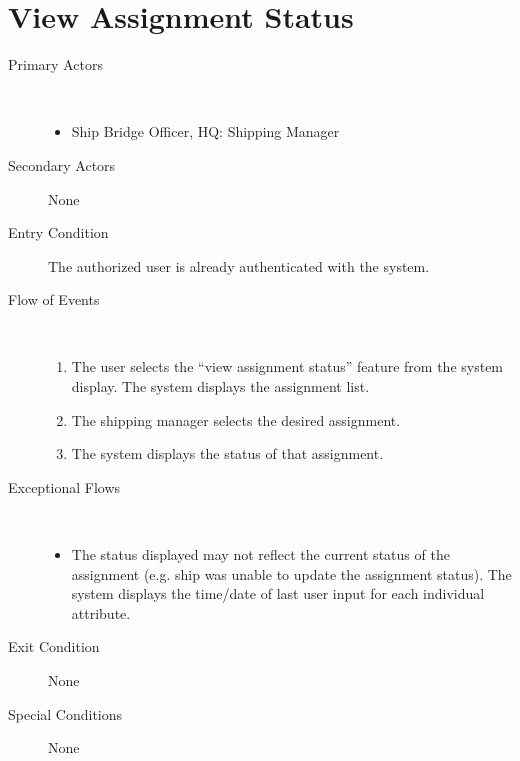 \documentclass[a4paper,10pt]{report}
\begin{document}
\section{View Assignment Status}
\begin{description}
\item[Primary Actors] \
  \begin{itemize}
  \item Ship Bridge Officer, HQ: Shipping Manager
  \end{itemize}
\item[Secondary Actors] None
\item[Entry Condition]
  The authorized user is already authenticated with the system.
\item[Flow of Events] \
  \begin{enumerate}
    \item The user selects the ``view assignment status'' feature from the system display. The system displays the assignment list.
    \item The shipping manager selects the desired assignment.
    \item The system displays the status of that assignment.
  \end{enumerate}
\item[Exceptional Flows] \
  \begin{itemize}
    \item The status displayed may not reflect the current status of the assignment (e.g. ship was unable to update the assignment status). The system displays the time/date of last user input for each individual attribute.
  \end{itemize}
\item[Exit Condition] None
\item[Special Conditions] None
\end{description}
\end{document}
